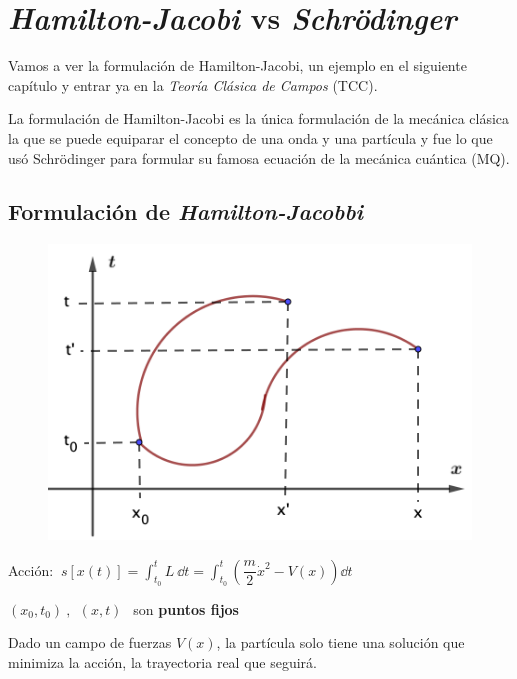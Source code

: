 \chapter{\emph{Hamilton-Jacobi} vs \emph{Schrödinger}}




\vspace{10mm}
\begin{adjustwidth}{50pt}{50pt}
\begin{ejemplo}
Vamos a ver la formulación de Hamilton-Jacobi, un ejemplo en el siguiente capítulo y entrar ya en la \emph{Teoría Clásica de Campos} (TCC).

La formulación de Hamilton-Jacobi es la única formulación de la mecánica clásica la que se puede equiparar el concepto de una onda y una partícula y fue lo que usó Schrödinger para formular su famosa ecuación de la mecánica cuántica (MQ).

\end{ejemplo}
\end{adjustwidth}
\vspace{5mm}

\section{Formulación de \emph{Hamilton-Jacobbi}}

\begin{multicols}{2}
\begin{figure}[H]
	\centering
	\includegraphics[width=.4\textwidth]{imagenes/img26-01.png}
\end{figure}	
Acción: $\ \displaystyle s[x(t)]=\int_{t_0}^t L\ \dd t =\int_{t_0}^t \left( \dfrac m 2 \dot x^2 - V(x) \right) \dd t$

$(x_0,t_0)\ , \ \ (x,t)\ \ $ son \textbf{puntos fijos}

Dado un campo de fuerzas $V(x)$, la partícula solo tiene una solución que minimiza la acción, la trayectoria real que seguirá.
\end{multicols}

